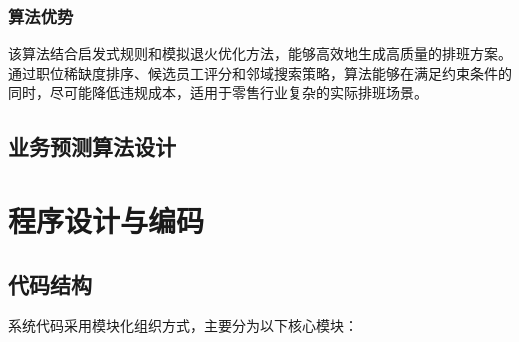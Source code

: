 \documentclass{ctexart}
\begin{document}
\subsubsection{算法优势}
该算法结合启发式规则和模拟退火优化方法，能够高效地生成高质量的排班方案。通过职位稀缺度排序、候选员工评分和邻域搜索策略，算法能够在满足约束条件的同时，尽可能降低违规成本，适用于零售行业复杂的实际排班场景。

\subsection{业务预测算法设计}

\section{程序设计与编码}
\subsection{代码结构}
系统代码采用模块化组织方式，主要分为以下核心模块：
\end{document}
